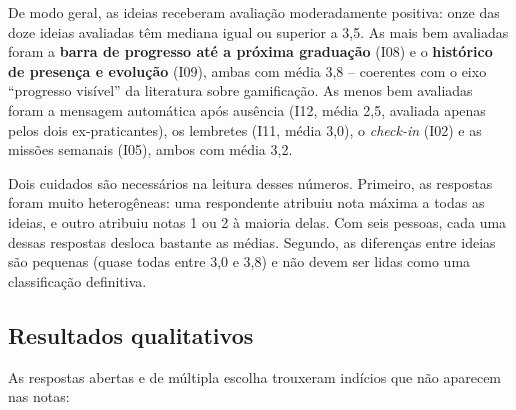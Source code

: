 De modo geral, as ideias receberam avaliação moderadamente positiva: onze
das doze ideias avaliadas têm mediana igual ou superior a 3,5. As mais
bem avaliadas foram a \textbf{barra de progresso até a próxima
graduação} (I08) e o \textbf{histórico de presença e evolução} (I09),
ambas com média 3,8 -- coerentes com o eixo ``progresso visível'' da
literatura sobre gamificação. As menos bem avaliadas foram a mensagem
automática após ausência (I12, média 2,5, avaliada apenas pelos dois
ex-praticantes), os lembretes (I11, média 3,0), o \textit{check-in}
(I02) e as missões semanais (I05), ambos com média 3,2.

Dois cuidados são necessários na leitura desses números. Primeiro, as
respostas foram muito heterogêneas: uma respondente atribuiu nota máxima
a todas as ideias, e outro atribuiu notas 1 ou 2 à maioria delas. Com
seis pessoas, cada uma dessas respostas desloca bastante as médias.
Segundo, as diferenças entre ideias são pequenas (quase todas entre 3,0
e 3,8) e não devem ser lidas como uma classificação definitiva.

\subsection{Resultados qualitativos}

As respostas abertas e de múltipla escolha trouxeram indícios que não
aparecem nas notas:

